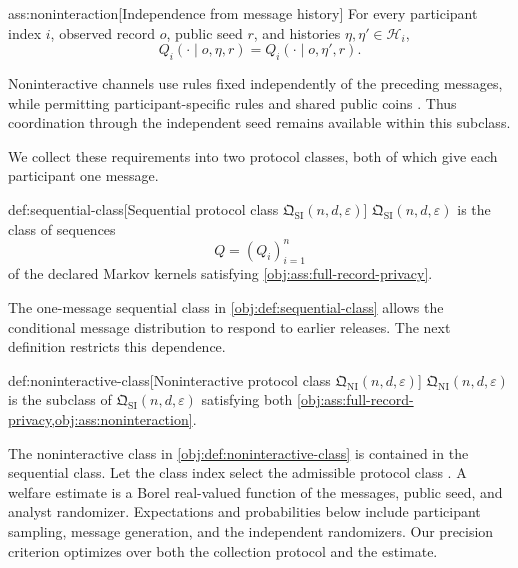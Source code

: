 \documentclass[11pt]{article}
\begin{document}
\begin{assumptionv}{ass:noninteraction}[Independence from message history]
For every participant index \(i\), observed record \(o\), public seed \(r\), and histories \(\eta,\eta'\in\mathcal H_i\),
\[
Q_i(\cdot\mid o,\eta,r)=Q_i(\cdot\mid o,\eta',r).
\]
\end{assumptionv}

Noninteractive channels use rules fixed independently of the preceding messages, while permitting participant-specific rules and shared public coins \citep{AcharyaCanonneFreitagTyagi2019TestWithoutTrust}. Thus coordination through the independent seed remains available within this subclass.

We collect these requirements into two protocol classes, both of which give each participant one message.

\begin{definitionv}{def:sequential-class}[Sequential protocol class $\mathfrak Q_{\mathrm{SI}}(n,d,\varepsilon)$]
\(\mathfrak Q_{\mathrm{SI}}(n,d,\varepsilon)\) is the class of sequences
\[
Q=(Q_i)_{i=1}^n
\]
of the declared Markov kernels satisfying \cref{obj:ass:full-record-privacy}.
\end{definitionv}

The one-message sequential class  in \cref{obj:def:sequential-class} allows the conditional message distribution to respond to earlier releases. The next definition restricts this dependence.

\begin{definitionv}{def:noninteractive-class}[Noninteractive protocol class $\mathfrak Q_{\mathrm{NI}}(n,d,\varepsilon)$]
\(\mathfrak Q_{\mathrm{NI}}(n,d,\varepsilon)\) is the subclass of \(\mathfrak Q_{\mathrm{SI}}(n,d,\varepsilon)\) satisfying both \cref{obj:ass:full-record-privacy,obj:ass:noninteraction}.
\end{definitionv}

The noninteractive class  in \cref{obj:def:noninteractive-class} is contained in the sequential class. Let the class index  select the admissible protocol class . A welfare estimate  is a Borel real-valued function of the messages, public seed, and analyst randomizer. Expectations and probabilities below include participant sampling, message generation, and the independent randomizers. Our precision criterion optimizes over both the collection protocol and the estimate.
\end{document}
